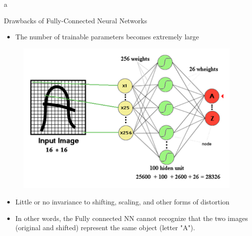 a\documentclass[10pt]{beamer}
\theoremstyle{remark}
\theoremstyle{definition}
\begin{document}
\begin{frame}[allowframebreaks]{Drawbacks of Fully-Connected Neural Networks}
\begin{itemize}
    \item The number of trainable parameters becomes extremely large
\end{itemize}

\begin{figure}
\centering
\includegraphics[width=1.0\textwidth,height=0.8\textheight,keepaspectratio]{./images/nn_2.png}
\end{figure}




\framebreak

\begin{itemize}
    \item Little or no invariance to shifting, scaling, and other forms of distortion

    \item In other words, the Fully connected NN cannot recognize that the two images (original and shifted) represent the same object (letter "A").
\end{itemize}


\end{frame}
\end{document}
